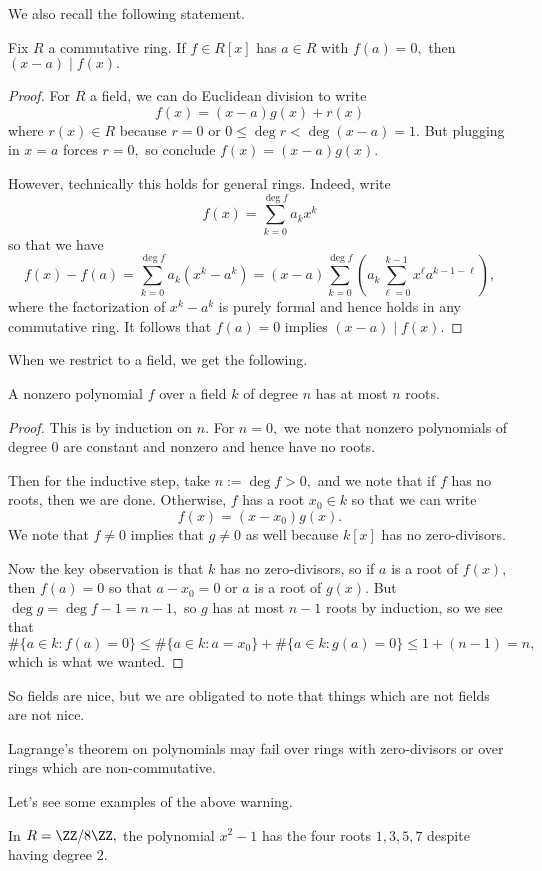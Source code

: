 \documentclass[../notes.tex]{subfiles}
\begin{document}
We also recall the following statement.
\begin{lemma}
	Fix $R$ a commutative ring. If $f\in R[x]$ has $a\in R$ with $f(a)=0,$ then $(x-a)\mid f(x).$
\end{lemma}
\begin{proof}
	For $R$ a field, we can do Euclidean division to write
	\[f(x)=(x-a)g(x)+r(x)\]
	where $r(x)\in R$ because $r=0$ or $0\le\deg r<\deg(x-a)=1.$ But plugging in $x=a$ forces $r=0,$ so conclude $f(x)=(x-a)g(x).$

	However, technically this holds for general rings. Indeed, write
	\[f(x)=\sum_{k=0}^{\deg f}a_kx^k\]
	so that we have
	\[f(x)-f(a)=\sum_{k=0}^{\deg f}a_k\left(x^k-a^k\right)=(x-a)\sum_{k=0}^{\deg f}\left(a_k\sum_{\ell=0}^{k-1}x^\ell a^{k-1-\ell}\right),\]
	where the factorization of $x^k-a^k$ is purely formal and hence holds in any commutative ring. It follows that $f(a)=0$ implies $(x-a)\mid f(x).$
\end{proof}
When we restrict to a field, we get the following.
\begin{proposition}[Lagrange]
	A nonzero polynomial $f$ over a field $k$ of degree $n$ has at most $n$ roots.
\end{proposition}
\begin{proof}
	This is by induction on $n.$ For $n=0,$ we note that nonzero polynomials of degree $0$ are constant and nonzero and hence have no roots.
	
	Then for the inductive step, take $n:=\deg f>0,$ and we note that if $f$ has no roots, then we are done. Otherwise, $f$ has a root $x_0\in k$ so that we can write
	\[f(x)=(x-x_0)g(x).\]
	We note that $f\ne0$ implies that $g\ne0$ as well because $k[x]$ has no zero-divisors.
	
	Now the key observation is that $k$ has no zero-divisors, so if $a$ is a root of $f(x),$ then $f(a)=0$ so that $a-x_0=0$ or $a$ is a root of $g(x).$ But $\deg g=\deg f-1=n-1,$ so $g$ has at most $n-1$ roots by induction, so we see that
	\[\#\{a\in k:f(a)=0\}\le\#\{a\in k:a=x_0\}+\#\{a\in k:g(a)=0\}\le1+(n-1)=n,\]
	which is what we wanted.
\end{proof}
So fields are nice, but we are obligated to note that things which are not fields are not nice.
\begin{warn}
	Lagrange's theorem on polynomials may fail over rings with zero-divisors or over rings which are non-commutative.
\end{warn}
Let's see some examples of the above warning.
\begin{example}
	In $R=\ZZ/8\ZZ,$ the polynomial $x^2-1$ has the four roots $1,3,5,7$ despite having degree $2.$
\end{example}
\end{document}
